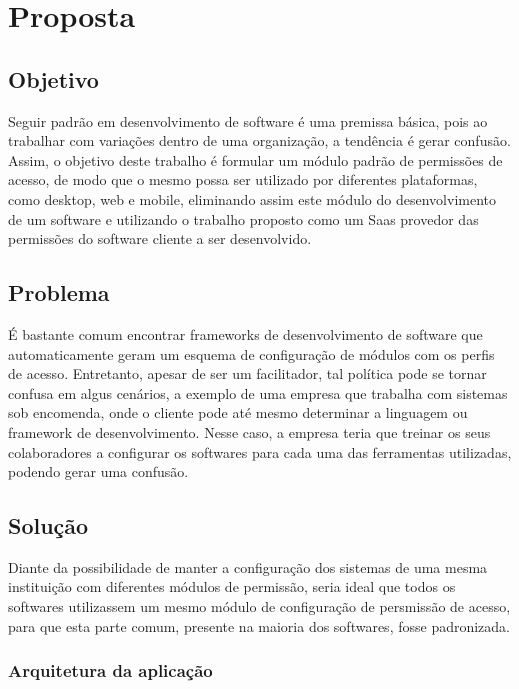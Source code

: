 \chapter{Proposta}


\section{Objetivo}\label{sec:objetivos} %


Seguir padrão em desenvolvimento de software é uma premissa básica, pois ao trabalhar com variações dentro de uma organização, a tendência é gerar confusão. Assim, o objetivo deste trabalho é formular um módulo padrão de permissões de acesso, de modo que o mesmo possa ser utilizado por diferentes plataformas, como desktop, web e mobile, eliminando assim este módulo do desenvolvimento de um software e utilizando o trabalho proposto como um Saas provedor das permissões do software cliente a ser desenvolvido.


\section{Problema}\label{sec:problema}


É bastante comum encontrar frameworks de desenvolvimento de software que automaticamente geram um esquema de configuração de módulos com os perfis de acesso. Entretanto, apesar de ser um facilitador, tal política pode se tornar confusa em algus cenários, a exemplo de uma empresa que trabalha com sistemas sob encomenda, onde o cliente pode até mesmo determinar a linguagem ou framework de desenvolvimento. Nesse caso, a empresa teria que treinar os seus colaboradores a configurar os softwares para cada uma das ferramentas utilizadas, podendo gerar uma confusão.


\section{Solução}\label{sec:solucao}


Diante da possibilidade de manter a configuração dos sistemas de uma mesma instituição com diferentes módulos de permissão, seria ideal que todos os softwares utilizassem um mesmo módulo de configuração de persmissão de acesso, para que esta parte comum, presente na maioria dos softwares, fosse padronizada.


\subsection{Arquitetura da aplicação}


